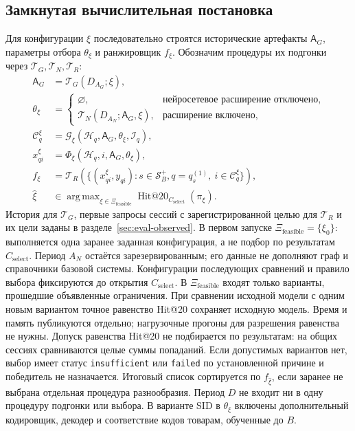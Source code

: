 \documentclass[12pt,a4paper]{article}
\newcommand{\code}[1]{{\ttfamily\small\nolinkurl{#1}}}
\DeclareMathOperator*{\argmax}{arg\,max}
\theoremstyle{plainru}
\begin{document}
\subsection{Замкнутая вычислительная постановка}

Для конфигурации $\xi$ последовательно строятся исторические артефакты
$\mathsf A_G$, параметры отбора $\theta_\xi$ и ранжировщик $f_\xi$.
Обозначим процедуры их подгонки через
$\mathcal T_G,\mathcal T_N,\mathcal T_R$:
\begin{align}
\mathsf A_G&=\mathcal T_G(D_{A_G};\xi),\\
\theta_\xi&=
\begin{cases}
\varnothing,&\text{нейросетевое расширение отключено},\\
\mathcal T_N(D_{A_N};\mathsf A_G,\xi),&\text{расширение включено},
\end{cases}\\
\mathcal C_q^\xi&=\mathcal G_\xi(\mathcal H_q,\mathsf A_G,\theta_\xi,\mathcal I_q),\\
x_{qi}^\xi&=\Phi_\xi(\mathcal H_q,i,\mathsf A_G,\theta_\xi),\\
f_\xi&=\mathcal T_R(\{(x_{qi}^\xi,y_{qi}):s\in\mathcal S_B^+,
q=q_s^{(1)},\ i\in\mathcal C_q^\xi\}),\\
\widehat\xi&\in\argmax_{\xi\in\Xi_{\mathrm{feasible}}}
\operatorname{Hit@20}_{C_{\mathrm{select}}}(\pi_\xi).
\end{align}
История для $\mathcal T_G$, первые запросы сессий с зарегистрированной
целью для $\mathcal T_R$ и их цели заданы в разделе~\ref{sec:eval-observed}.
В первом запуске $\Xi_{\mathrm{feasible}}=\{\xi_0\}$:
выполняется одна заранее заданная конфигурация, а не подбор
по результатам $C_{\mathrm{select}}$. Период $A_N$ остаётся зарезервированным;
его данные не дополняют граф и справочники базовой системы.
Конфигурации последующих сравнений и правило выбора фиксируются
до открытия $C_{\mathrm{select}}$.
В $\Xi_{\mathrm{feasible}}$ входят только варианты, прошедшие объявленные
ограничения. При сравнении исходной модели с одним новым вариантом
точное равенство Hit@20 сохраняет исходную модель. Время и память
публикуются отдельно; нагрузочные прогоны для разрешения равенства не нужны.
Допуск равенства Hit@20 не подбирается по результатам:
на общих сессиях сравниваются целые суммы попаданий.
Если допустимых вариантов нет, выбор имеет статус \code{insufficient}
или \code{failed} по установленной причине и победитель не назначается.
Итоговый список сортируется по $f_{\widehat\xi}$, если заранее не выбрана
отдельная процедура разнообразия. Период $D$ не входит ни в одну
процедуру подгонки или выбора.
В варианте SID в $\theta_\xi$ включены дополнительный кодировщик,
декодер и соответствие кодов товарам, обученные до $B$.
\end{document}
